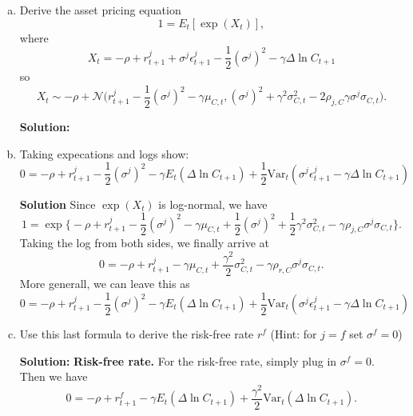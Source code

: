 \documentclass[11pt]{extarticle}
\theoremstyle{plain}
\theoremstyle{definition}
\begin{document}
\begin{enumerate}[(a)]
\item Derive the asset pricing equation
\begin{equation*}
	1 = E_t [\exp(X_t)],
\end{equation*}
where 
\begin{equation*}
	X_t = -\rho + r_{t+1}^j + \sigma^j \epsilon_{t+1}^j - \frac{1}{2} (\sigma^j)^2 - \gamma \Delta \ln C_{t+1} 
\end{equation*}
so
\begin{equation*}
X_t \sim -\rho + \mathcal{N}\bigg(r_{t+1}^j - \frac{1}{2} (\sigma^j)^2 - \gamma \mu_{C,t}, (\sigma^j)^2 + \gamma^2 \sigma_{C,t}^2 - 2 \rho_{j,C} \gamma \sigma^j \sigma_{C,t} \bigg).
\end{equation*}

\textbf{Solution:}


\item Taking expecations and logs show:
\begin{equation}
	0 =  - \rho + r_{t+1}^j - \frac{1}{2} (\sigma^j)^2 - \gamma E_t(\Delta \ln C_{t+1}) + \frac{1}{2} \text{Var}_t( \sigma^j \epsilon_{t+1}^j - \gamma \Delta \ln C_{t+1})
\end{equation}


\textbf{Solution}
Since $\exp(X_t)$ is log-normal, we have 
\begin{equation*}
	1 = \exp \bigg\{ - \rho + r_{t+1}^j - \frac{1}{2} (\sigma^j)^2 - \gamma \mu_{C,t} + \frac{1}{2} (\sigma^j)^2 + \frac{1}{2} \gamma^2 \sigma_{C,t}^2 - \gamma \rho_{j,C} \sigma^j \sigma_{C,t} \bigg\}.
\end{equation*}
Taking the log from both sides, we finally arrive at
\begin{equation}
	0  = - \rho + r_{t+1}^j - \gamma \mu_{C,t} + \frac{\gamma^2}{2} \sigma_{C,t}^2 - \gamma \rho_{r,C} \sigma^j \sigma_{C,t}.
\end{equation}
More generall, we can leave this as 
\begin{equation}
	0 =  - \rho + r_{t+1}^j - \frac{1}{2} (\sigma^j)^2 - \gamma E_t(\Delta \ln C_{t+1}) + \frac{1}{2} \text{Var}_t( \sigma^j \epsilon_{t+1}^j - \gamma \Delta \ln C_{t+1})
\end{equation}


\item Use this last formula to derive the risk-free rate $r^f$ (Hint: for $j=f$ set $\sigma^f=0$)

\textbf{Solution:}
\vspace{5mm}
\noindent
\textbf{Risk-free rate.} For the risk-free rate, simply plug in $\sigma^f = 0$. Then we have 
\begin{equation}
	0 =  - \rho + r_{t+1}^f - \gamma E_t(\Delta \ln C_{t+1}) + \frac{\gamma^2}{2} \text{Var}_t( \Delta \ln C_{t+1}).
\end{equation}



\end{enumerate}
\end{document}
